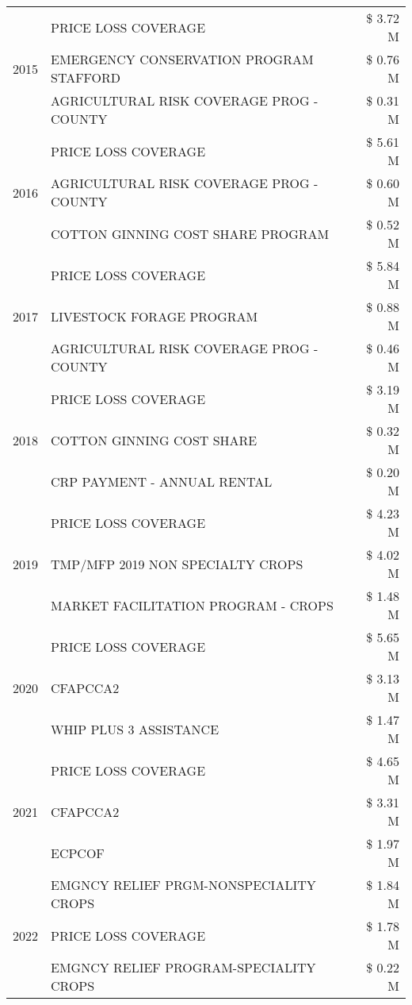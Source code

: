 \begin{tabular}{llr}
\multirow[t]{3}{*}{2015} & PRICE LOSS COVERAGE & \$ 3.72 M \\
 & EMERGENCY CONSERVATION PROGRAM STAFFORD & \$ 0.76 M \\
 & AGRICULTURAL RISK COVERAGE PROG - COUNTY & \$ 0.31 M \\
\cline{1-3}
\multirow[t]{3}{*}{2016} & PRICE LOSS COVERAGE & \$ 5.61 M \\
 & AGRICULTURAL RISK COVERAGE PROG - COUNTY & \$ 0.60 M \\
 & COTTON GINNING COST SHARE PROGRAM & \$ 0.52 M \\
\cline{1-3}
\multirow[t]{3}{*}{2017} & PRICE LOSS COVERAGE & \$ 5.84 M \\
 & LIVESTOCK FORAGE PROGRAM & \$ 0.88 M \\
 & AGRICULTURAL RISK COVERAGE PROG - COUNTY & \$ 0.46 M \\
\cline{1-3}
\multirow[t]{3}{*}{2018} & PRICE LOSS COVERAGE & \$ 3.19 M \\
 & COTTON GINNING COST SHARE & \$ 0.32 M \\
 & CRP PAYMENT - ANNUAL RENTAL & \$ 0.20 M \\
\cline{1-3}
\multirow[t]{3}{*}{2019} & PRICE LOSS COVERAGE & \$ 4.23 M \\
 & TMP/MFP 2019 NON SPECIALTY CROPS & \$ 4.02 M \\
 & MARKET FACILITATION PROGRAM - CROPS & \$ 1.48 M \\
\cline{1-3}
\multirow[t]{3}{*}{2020} & PRICE LOSS COVERAGE & \$ 5.65 M \\
 & CFAPCCA2 & \$ 3.13 M \\
 & WHIP PLUS 3 ASSISTANCE & \$ 1.47 M \\
\cline{1-3}
\multirow[t]{3}{*}{2021} & PRICE LOSS COVERAGE & \$ 4.65 M \\
 & CFAPCCA2 & \$ 3.31 M \\
 & ECPCOF & \$ 1.97 M \\
\cline{1-3}
\multirow[t]{3}{*}{2022} & EMGNCY RELIEF PRGM-NONSPECIALITY CROPS & \$ 1.84 M \\
 & PRICE LOSS COVERAGE & \$ 1.78 M \\
 & EMGNCY RELIEF PROGRAM-SPECIALITY CROPS & \$ 0.22 M \\
\cline{1-3}
\bottomrule
\end{tabular}
